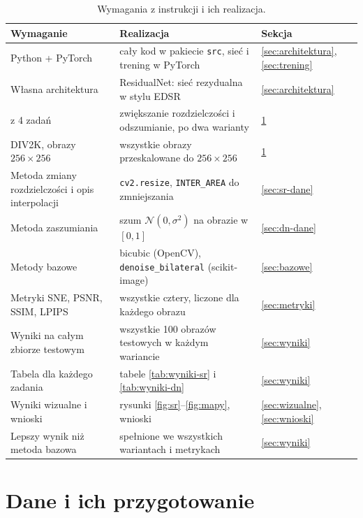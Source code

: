 \documentclass[11pt,a4paper]{article}
\newcommand{\code}[1]{\texttt{\mdseries #1}}
\newcommand{\nazwa}{ResidualNet}
\begin{document}
\begin{table}[H]
  \centering\small
  \caption{Wymagania z instrukcji i ich realizacja.}
  \label{tab:wymagania}
  \begin{tabularx}{\textwidth}{@{}>{\raggedright\arraybackslash}p{4.6cm}X>{\centering\arraybackslash}p{1.4cm}@{}}
    \toprule
    Wymaganie & Realizacja & Sekcja \\
    \midrule
    Python + PyTorch & cały kod w pakiecie \code{src}, sieć i trening w PyTorch & \ref{sec:architektura}, \ref{sec:trening} \\
    Własna architektura & \nazwa{}: sieć rezydualna w stylu EDSR & \ref{sec:architektura} \\
    2 z 4 zadań & zwiększanie rozdzielczości i odszumianie, po dwa warianty & \ref{sec:dane} \\
    DIV2K, obrazy $256\times256$ & wszystkie obrazy przeskalowane do $256\times256$ & \ref{sec:dane} \\
    Metoda zmiany rozdzielczości i opis interpolacji & \code{cv2.resize}, \code{INTER\_AREA} do zmniejszania & \ref{sec:sr-dane} \\
    Metoda zaszumiania & szum $\mathcal{N}(0,\sigma^2)$ na obrazie w $[0,1]$ & \ref{sec:dn-dane} \\
    Metody bazowe & bicubic (OpenCV), \code{denoise\_bilateral} (scikit-image) & \ref{sec:bazowe} \\
    Metryki SNE, PSNR, SSIM, LPIPS & wszystkie cztery, liczone dla każdego obrazu & \ref{sec:metryki} \\
    Wyniki na całym zbiorze testowym & wszystkie 100 obrazów testowych w każdym wariancie & \ref{sec:wyniki} \\
    Tabela dla każdego zadania & tabele \ref{tab:wyniki-sr} i \ref{tab:wyniki-dn} & \ref{sec:wyniki} \\
    Wyniki wizualne i wnioski & rysunki \ref{fig:sr}--\ref{fig:mapy}, wnioski & \ref{sec:wizualne}, \ref{sec:wnioski} \\
    Lepszy wynik niż metoda bazowa & spełnione we wszystkich wariantach i metrykach & \ref{sec:wyniki} \\
    \bottomrule
  \end{tabularx}
\end{table}

\section{Dane i ich przygotowanie}\label{sec:dane}
\end{document}
